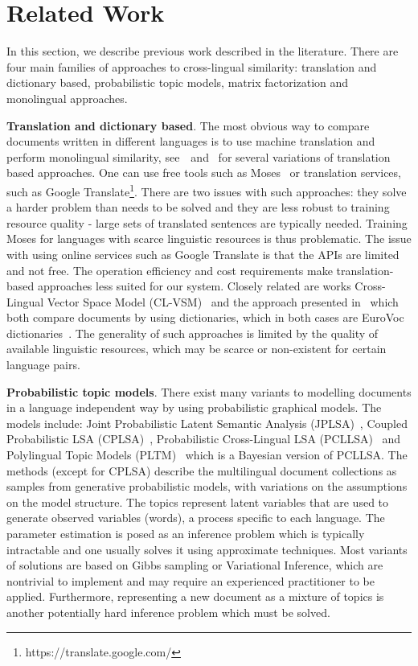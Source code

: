 \section{Related Work}\label{chap:crosslingual:related}
In this section, we describe previous work described  in the literature. There are four main families of approaches to cross-lingual similarity:
translation and dictionary based, probabilistic topic models, matrix factorization and monolingual approaches.

\textbf{Translation and dictionary based}. The most obvious way to compare documents written in different languages is to use machine translation and perform monolingual similarity, see~\cite{multilingualBook}~and~\cite{plagiarism} for several variations of translation based approaches. One can use free tools such as Moses~\cite{moses} or translation services, such as Google Translate\footnote{https://translate.google.com/}. There are two issues with such approaches: they solve a harder problem than needs to be solved and they are less robust to training resource quality - large sets of translated sentences are typically needed. Training Moses for languages with scarce linguistic resources is thus problematic. The issue with using online services such as Google Translate is that the APIs are limited and not free. The operation efficiency and cost requirements make translation-based approaches less suited for our system. Closely related are works Cross-Lingual Vector Space Model (CL-VSM)~\cite{plagiarism} and the approach presented in~\cite{pouliquen2008story} which both compare documents by using dictionaries, which in both cases are EuroVoc dictionaries~\cite{eurovoc}. The generality of such approaches is limited by the quality of available linguistic resources, which may be scarce or non-existent for certain language pairs.

\textbf{Probabilistic topic models}. There exist many variants to modelling documents in a language independent way by using probabilistic graphical models. The models include:  Joint Probabilistic Latent Semantic Analysis (JPLSA)~\cite{platt2010translingual}, Coupled Probabilistic LSA (CPLSA)~\cite{platt2010translingual}, Probabilistic Cross-Lingual LSA (PCLLSA)~\cite{PCL_LSA} and Polylingual Topic Models (PLTM)~\cite{polyLDA} which is a Bayesian version of PCLLSA. The methods (except for CPLSA) describe the multilingual document collections as samples from generative probabilistic models, with variations on the assumptions on the model structure. The topics represent latent variables that are used to generate observed variables (words), a process specific to each language. The parameter estimation is posed as an inference problem which is typically intractable and one usually solves it using approximate techniques. Most variants of solutions are based on Gibbs sampling or Variational Inference, which are nontrivial to implement and may require an experienced practitioner to be applied. Furthermore, representing a new document as a mixture of topics is another potentially hard inference problem which must be solved.


